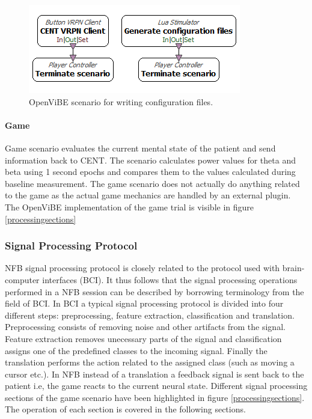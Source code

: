 \begin{figure}[h]
	\centering
	\includegraphics[scale=0.4]{config.png}
	\caption{OpenViBE scenario for writing configuration files.}\label{configuration}
\end{figure}  

\paragraph{Game}
Game scenario evaluates the current mental state of the patient and send information back to CENT. The scenario calculates power values for theta and beta using 1 second epochs and compares them to the values calculated during baseline measurement. The game scenario does not actually do anything related to the game as the actual game mechanics are handled by an external plugin. The OpenViBE implementation of the game trial is visible in figure \ref{processingsections}

  
\subsubsection{Signal Processing Protocol}
NFB signal processing protocol is closely related to the protocol used with brain-computer interfaces (BCI). It thus follows that the signal processing operations performed in a NFB session can be described by borrowing terminology from the field of BCI. In BCI a typical signal processing protocol is divided into four different steps: preprocessing, feature extraction, classification and translation. Preprocessing consists of removing noise and other artifacts from the signal. Feature extraction removes unecessary parts of the signal and classification assigns one of the predefined classes to the incoming signal. Finally the translation performs the action related to the assigned class (such as moving a cursor etc.). In NFB instead of a translation a feedback signal is sent back to the patient i.e, the game reacts to the current neural state. Different signal processing sections of the game scenario have been highlighted in figure \ref{processingsections}. The operation of each section is covered in the following sections.

